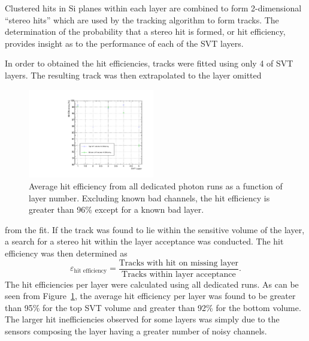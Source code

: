 
%
%
 
Clustered hits in Si planes within each layer are combined to form
2-dimensional ``stereo hits'' which are used by the tracking algorithm to 
form tracks.  The determination of the probability that a stereo hit is 
formed, or hit efficiency, provides insight as to the performance of each of 
the SVT layers.

In order to obtained the hit efficiencies, tracks were fitted using only 4 of 
SVT layers. The resulting track was then extrapolated to the layer omitted
\begin{figure}[h]
    	\includegraphics[width=0.49\textwidth]{test2012/svtperformance/trk_performance/hit_efficiency_vs_layer.pdf}
        \caption{{\small
                    Average hit efficiency
                    from all dedicated photon runs as a function of layer
                    number.  Excluding known bad channels, the hit efficiency
                    is greater than 96\% except for a known bad layer.
                                    }} 
	\label{fig:hit_track_efficiency}
\end{figure}
from the fit. If the track was found to lie within the sensitive volume
of the layer, a search for a stereo hit within the layer acceptance was 
conducted.  The hit efficiency was then determined as
\[
    \varepsilon_{\mbox{hit efficiency}} = \frac{\mbox{Tracks with hit on missing layer}}
                                            {\mbox{Tracks within layer acceptance}}.
\]
The hit efficiencies per layer were calculated using all dedicated runs. As 
can be seen from Figure~\ref{fig:hit_track_efficiency}, the average hit efficiency
per layer was found to be greater than
95\% for the top SVT volume and greater than 92\% for the bottom volume.  The 
larger hit inefficiencies observed for some layers was simply due to the 
sensors composing the layer having a greater number of noisy channels.

